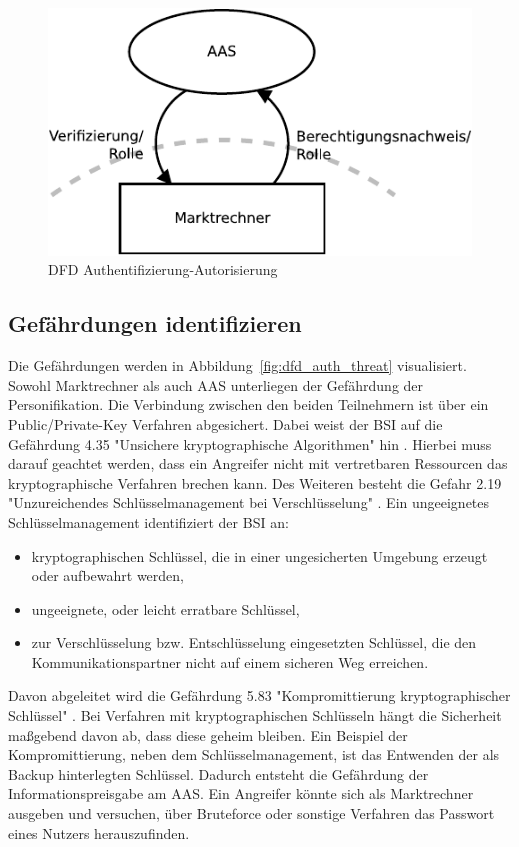 \documentclass[11pt,a4paper]{report}
\begin{document}
\begin{figure}[htbp]
\centering
\includegraphics[scale=1.1]{images/dfd_auth.pdf}
\caption{DFD Authentifizierung-Autorisierung}
\label{fig:dfd_auth}
\end{figure}

\subsection{Gefährdungen identifizieren}

Die Gefährdungen werden in Abbildung~\ref{fig:dfd_auth_threat} visualisiert. Sowohl Marktrechner als auch AAS unterliegen der Gefährdung der Personifikation. Die Verbindung zwischen den beiden Teilnehmern ist über ein Public/Private-Key Verfahren abgesichert. Dabei weist der BSI auf die Gefährdung 4.35 "Unsichere kryptographische Algorithmen" hin \cite{bsi_g4035}. Hierbei muss darauf geachtet werden, dass ein Angreifer nicht mit vertretbaren Ressourcen das kryptographische Verfahren brechen kann. Des Weiteren besteht die Gefahr 2.19 "Unzureichendes Schlüsselmanagement bei Verschlüsselung" \cite{bsi_g2019}. Ein ungeeignetes Schlüsselmanagement identifiziert der BSI an:

\begin{itemize}
\item kryptographischen Schlüssel, die in einer ungesicherten Umgebung erzeugt oder aufbewahrt werden,
\item ungeeignete, oder leicht erratbare Schlüssel,
\item zur Verschlüsselung bzw. Entschlüsselung eingesetzten Schlüssel, die den Kommunikationspartner nicht auf einem sicheren Weg erreichen.
\end{itemize}

Davon abgeleitet wird die Gefährdung 5.83 "Kompromittierung kryptographischer Schlüssel" \cite{bsi_g5083}. Bei Verfahren mit kryptographischen Schlüsseln hängt die Sicherheit maßgebend davon ab, dass diese geheim bleiben. Ein Beispiel der Kompromittierung, neben dem Schlüsselmanagement, ist das Entwenden der als Backup hinterlegten Schlüssel. Dadurch entsteht die Gefährdung der Informationspreisgabe am AAS. Ein Angreifer könnte sich als Marktrechner ausgeben und versuchen, über Bruteforce oder sonstige Verfahren das Passwort eines Nutzers herauszufinden.
\end{document}
